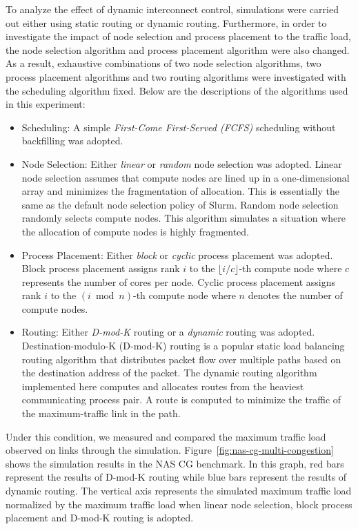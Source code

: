 To analyze the effect of dynamic interconnect control, simulations were
carried out either using static routing or dynamic routing. Furthermore,
in order to investigate the impact of node selection and process
placement to the traffic load, the node selection algorithm and process
placement algorithm were also changed. As a result, exhaustive
combinations of two node selection algorithms, two process placement
algorithms and two routing algorithms were investigated with the
scheduling algorithm fixed. Below are the descriptions of the algorithms
used in this experiment:

\begin{itemize}
\item
  Scheduling: A simple \emph{First-Come First-Served (FCFS)} scheduling
  without backfilling was adopted.
\item
  Node Selection: Either \emph{linear} or \emph{random} node selection
  was adopted. Linear node selection assumes that compute nodes are
  lined up in a one-dimensional array and minimizes the fragmentation of
  allocation. This is essentially the same as the default node selection
  policy of Slurm. Random node selection randomly selects compute
  nodes. This algorithm simulates a situation where the allocation of
  compute nodes is highly fragmented.
\item
  Process Placement: Either \emph{block} or \emph{cyclic} process
  placement was adopted. Block process placement assigns rank \(i\) to
  the \(\lfloor i / c \rfloor\)-th compute node where \(c\) represents
  the number of cores per node. Cyclic process placement assigns rank
  \(i\) to the \((i \bmod n)\)-th compute node where \(n\) denotes the
  number of compute nodes.
\item
  Routing: Either \emph{D-mod-K} routing or a \emph{dynamic} routing was
  adopted. Destination-modulo-K (\mbox{D-mod-K}) routing is a
  popular static load balancing routing algorithm that distributes
  packet flow over multiple paths based on the destination address of
  the packet. The dynamic routing algorithm implemented here computes
  and allocates routes from the heaviest communicating process pair. A
  route is computed to minimize the traffic of the maximum-traffic link
  in the path.
\end{itemize}

Under this condition, we measured and compared the maximum traffic load
observed on links through the simulation.
Figure~\ref{fig:nas-cg-multi-congestion} shows the simulation results in
the NAS CG benchmark. In this graph, red bars represent the results of
\mbox{D-mod-K} routing while blue bars represent the results of dynamic
routing. The vertical axis represents the simulated maximum traffic load
normalized by the maximum traffic load when linear node selection, block
process placement and \mbox{D-mod-K} routing is adopted.

